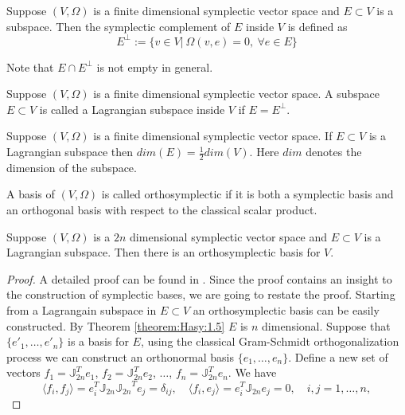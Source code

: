 {\edit 
\begin{definition}  \cite{de2006symplectic}
Suppose $(V,\Omega)$ is a finite dimensional symplectic vector space and $E\subset V$ is a subspace. Then the symplectic complement of $E$ inside $V$ is defined as
\[
	E^{\perp} := \{ v\in V |\ \Omega(v,e) = 0,\ \forall e\in E \}
\]
\end{definition}
Note that $E \cap E^{\perp}$ is not empty in general. 
\begin{definition} \cite{de2006symplectic}
Suppose $(V,\Omega)$ is a finite dimensional symplectic vector space. A subspace $E\subset V$ is called a Lagrangian subspace inside $V$ if $E = E^\perp$.
\end{definition}
\begin{theorem} \label{theorem:Hasy:1.5} \cite{abraham1978foundations}
Suppose $(V,\Omega)$ is a finite dimensional symplectic vector space. If $E\subset V$ is a Lagrangian subspace then $dim(E)=\frac 1 2dim(V)$. Here $dim$ denotes the dimension of the subspace.
\end{theorem}
\begin{definition}
A basis of $(V,\Omega)$ is called orthosymplectic if it is both a symplectic basis and an orthogonal basis with respect to the classical scalar product.
\end{definition}
\begin{theorem} \label{theorem:Hasy:1.6}  \cite{mehl2009perturbation,da2003introduction}
Suppose $(V,\Omega)$ is a $2n$ dimensional symplectic vector space and $E\subset V$ is a Lagrangian subspace. Then there is an orthosymplectic basis for $V$.
\end{theorem}
\begin{proof}
{\blue A detailed proof can be found in \cite{mehl2009perturbation}. Since the proof contains an insight to the construction of symplectic bases, we are going to restate the proof.} Starting from a Lagrangain subspace in $E \subset V$ an orthosymplectic basis can be easily constructed. By Theorem \ref{theorem:Hasy:1.5} $E$ is $n$ dimensional. Suppose that $\{ e'_1,\dots, e'_n \}$ is a basis for $E$, using the classical Gram-Schmidt orthogonalization process we can construct an orthonormal basis $\{ e_1,\dots,e_n \}$. Define a new set of vectors $f_1 = \mathbb J_{2n}^Te_1$, $f_2 =\mathbb J_{2n}^T e_2$, $\dots$, $f_n= \mathbb J_{2n}^Te_n$. We have
\begin{equation}
	\langle f_i, f_j \rangle = e_i^T \mathbb J_{2n} {\mathbb J_{2n}}^T e_j = \delta_{ij}, \quad \langle f_i, e_j \rangle = e_i^T \mathbb J_{2n} e_j = 0, \quad i,j=1,\dots,n,

\end{equation}
\end{proof}}
